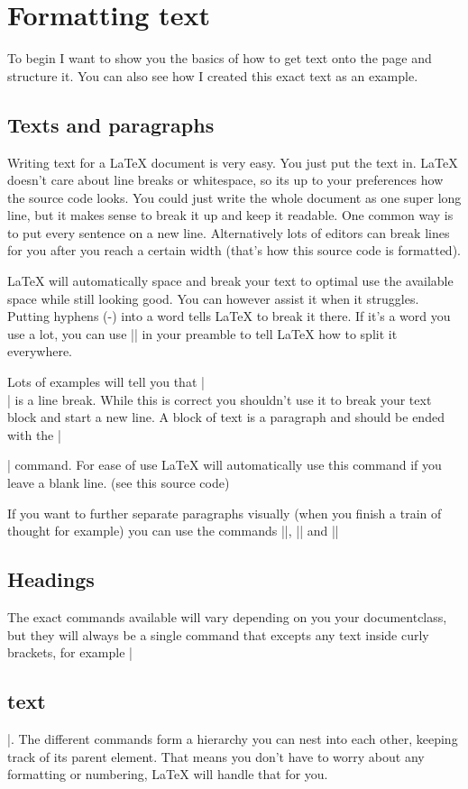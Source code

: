 \chapter{Formatting text} \label{:chap formating}
    To begin I want to show you the basics of how to get text onto the page and structure it. You can also see how I created this exact text as an
    example.

    \section{Texts and paragraphs} \label{sec: text and par}
        Writing text for a LaTeX document is very easy. You just put the text in. LaTeX doesn't care about line breaks or whitespace, so its up to
        your preferences how the source code looks. You could just write the whole document as one super long line, but it makes sense to break it up
        and keep it readable. One common way is to put every sentence on a new line. Alternatively lots of editors can break lines for you after you
        reach a certain width (that's how this source code is formatted).

        LaTeX will automatically space and break your text to optimal use the available space while still looking good. You can however assist it when
        it struggles. Putting hyphens (-) into a word tells LaTeX to break it there. If it's a word you use a lot, you can use
        || in your preamble to tell LaTeX how to split it everywhere.

        Lots of examples will tell you that |\\| is a line break. While this is correct you shouldn't use it to break your text block and
        start a new line. A block of text is a paragraph and should be ended with the |\par| command. For ease of use LaTeX will
        automatically use this command if you leave a blank line. (see this source code)

        If you want to further separate paragraphs visually (when you finish a train of thought for example) you can use the commands
        |\smallskip|, |\medskip| and |\bigskip|

    \section{Headings} \label{sec: headings}
        The exact commands available will vary depending on you your documentclass, but they will always be a single command that excepts any text
        inside curly brackets, for example |\section{text}|. The different commands form a hierarchy you can nest into each other, keeping
        track of its parent element. That means you don't have to worry about any formatting or numbering, LaTeX will handle that for you.

